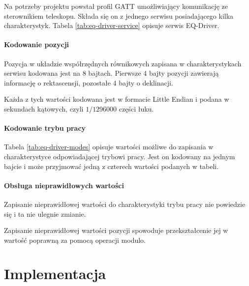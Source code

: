 Na potrzeby projektu powstał profil GATT umożliwiający komunikację ze
sterownikiem teleskopu. Składa się on z jednego serwisu posiadającego kilka
charakterystyk. Tabela \ref{tab:eq-driver-service} opisuje serwis EQ-Driver.

\paragraph{Kodowanie pozycji} Pozycja w układzie współrzędnych równikowych
zapisana w charakterystykach serwisu kodowana jest na 8 bajtach. Pierwsze
4 bajty pozycji zawierają informację o rektascensji, pozostałe 4 bajty
o deklinacji.

Każda z tych wartości kodowana jest w formacie Little Endian i podana
w sekundach kątowych, czyli $1/1296000$ części łuku.

\paragraph{Kodowanie trybu pracy} Tabela \ref{tab:eq-driver-modes} opisuje
wartości możliwe do zapisania w charakterystyce odpowiadającej trybowi pracy.
Jest on kodowany na jednym bajcie i może przyjmować jedną z czterech wartości
podanych w tabeli.

\paragraph{Obsługa nieprawidłowych wartości} Zapisanie nieprawidłowej wartości
do charakterystyki trybu pracy nie powiedzie się i ta nie ulegnie zmianie.

Zapisanie nieprawidłowej wartości pozycji spowoduje przekształcenie jej
w wartość poprawną za pomocą operacji modulo.

\section{Implementacja}


